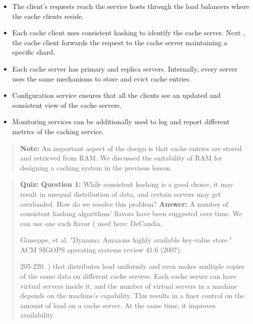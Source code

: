 \begin{itemize}
\item
\protect{}\label{Jfi5VKQtLBlw203auNc_t}
The client's requests reach the service hosts through the load balancers where the cache clients reside.
\item
\protect{}\label{NaucYZ07rMHpozr3asazT}
Each cache client uses consistent hashing to identify the cache server. Next , the cache client forwards the request to the cache server maintaining a specific shard.
\item
\protect{}\label{AlcsenIpsoKS8slfYjb5w}
Each cache server has primary and replica servers. Internally, every server uses the same mechanisms to store and evict cache entries.
\item
\protect{}\label{eaMDjhQCsvM_Gtdk32zaC}
Configuration service ensures that all the clients see an updated and consistent view of the cache servers.
\item
\protect{}\label{Da1TJlxZ_JHPBBEUHEaKH}
Monitoring services can be additionally used to log and report different metrics of the caching service.
\end{itemize}
\begin{quote}
\textbf{Note:} An important aspect of the design is that cache entries are stored and retrieved from RAM. We discussed the suitability of RAM for designing a caching system in the previous lesson.
\end{quote}

\begin{quote}
\textbf{Quiz:}
\textbf{Question 1:} While consistent hashing is a good choice, it may result in unequal distribution of data, and certain servers may get overloaded. How do we resolve this problem?
\textbf{Answer:} A number of consistent hashing algorithms' flavors have been suggested over time. We can use one such flavor ( used here: DeCandia,

Giuseppe, et al. "Dynamo: Amazon\textquotesingle s highly available key-value store." ACM SIGOPS operating systems review 41.6 (2007):

205-220. ) that distributes load uniformly and even makes multiple copies of the same data on different cache servers. Each cache server can have virtual servers inside it, and the number of virtual servers in a machine depends on the machine's capability. This results in a finer control on the amount of load on a cache server. At the same time, it improves availability.
\end{quote}



